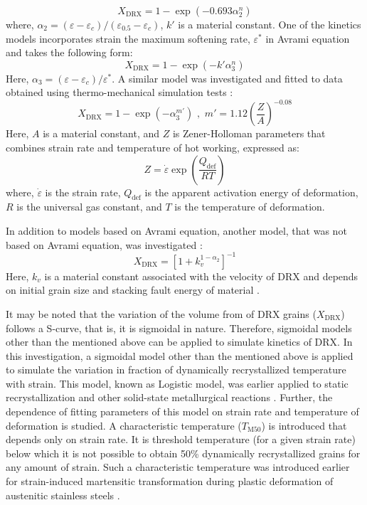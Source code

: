 \documentclass[a4paper, 11pt, dvipsnames]{article}
\begin{document}
\begin{equation*}
X_\text{DRX} = 1 - \exp\left(-0.693\alpha_2^{n}\right)
\end{equation*}
where, $\alpha_2 = (\varepsilon - \varepsilon_c)/(\varepsilon_{0.5}-\varepsilon_c)$, $k'$ is a material constant. One of the kinetics models \cite{X6} incorporates strain the maximum softening rate, $\varepsilon^*$ in Avrami equation and takes the following form:
\begin{equation*}
X_\text{DRX} = 1 - \exp\left(-k'\alpha_3^{n}\right)
\end{equation*}
Here, $\alpha_3 = (\varepsilon - \varepsilon_c)/\varepsilon^{*}$. A similar  model was investigated and fitted to data obtained using thermo-mechanical simulation tests \cite{X7, X8}:
\begin{equation*}
X_\text{DRX} = 1 - \exp(-\alpha_3^{m'}) \,\, , \,\, m' = 1.12\left(\dfrac{Z}{A}\right)^{-0.08}
\end{equation*}
Here, $A$ is a material constant, and $Z$ is Zener-Holloman parameters that combines strain rate and temperature of hot working, expressed as:
\begin{equation*}
Z = \dot{\varepsilon}\exp\left(\frac{Q_\text{def}}{RT}\right)
\end{equation*}
where, $\dot{\varepsilon}$ is the strain rate, $Q_\text{def}$ is the apparent activation energy of deformation, $R$ is the universal gas constant, and $T$ is the temperature of deformation. 

In addition to models based on Avrami equation, another model, that was not based on Avrami equation, was investigated \cite{C1}:
\begin{equation*}
X_\text{DRX} = \left[ 1 + k_v^{1 - \alpha_2}\right]^{-1}
\end{equation*}
Here, $k_v$ is a material constant associated with the velocity of DRX and depends on initial grain size and stacking fault energy of material \cite{C1}. 

It may be noted that the variation of the volume from of DRX grains ($X_\text{DRX}$) follows a S-curve, that is, it is sigmoidal in nature. Therefore, sigmoidal models other than the mentioned above can be applied to simulate kinetics of DRX. In this investigation, a sigmoidal model other than the mentioned above is applied to simulate the variation in fraction of dynamically recrystallized temperature with strain. This model, known as Logistic model, was earlier applied to static recrystallization \cite{Y1} and other solid-state metallurgical reactions \cite{Y1, Y2}. Further, the dependence of fitting parameters of this model on strain rate and temperature of deformation is studied. A characteristic temperature ($T_\text{M50}$) is introduced that depends only on strain rate. It is threshold temperature (for a given strain rate) below which it is not possible to obtain 50\% dynamically recrystallized grains for any amount of strain. Such a characteristic temperature was introduced earlier for strain-induced martensitic transformation during plastic deformation of austenitic stainless steels \cite{Y3}.
\end{document}
